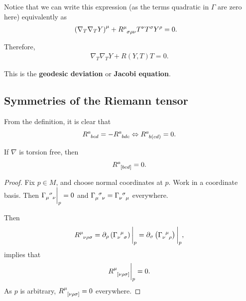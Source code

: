 
Notice that we can write this expression (as the terms quadratic in $\Gamma$ are zero here) equivalently as 
\begin{align}
    \left( \nabla_T \nabla_T Y \right)^{\mu} + \tensor{R}{^{\mu}_{\sigma \rho \nu}} T^{\nu} T^{\sigma} Y^{\rho} &= 0 
.\end{align}

Therefore,
\begin{align}
    \nabla_T \nabla_T Y + R \left( Y,T \right) T = 0
.\end{align}

This is the \textbf{geodesic deviation} or \textbf{Jacobi equation}.

\subsection{Symmetries of the Riemann tensor}

From the definition, it is clear that
\begin{align}
    \tensor{R}{^{a}_{bcd}} = -\tensor{R}{^{a}_{bdc}} \iff \tensor{R}{^{a}_{b ( cd )}} = 0 
.\end{align}

\begin{proposition}
    If $\nabla$ is torsion free, then
    \begin{align}
        \tensor{R}{^{a}_{[bcd]}} = 0
    .\end{align}
\end{proposition}

\begin{proof}
    Fix $p \in M$, and choose normal coordinates at $p$. Work in a coordinate basis. Then $\tensor{\Gamma}{_{\mu}^{\sigma}_\nu} \bigg|_{p} = 0$ and $\tensor{\Gamma}{_{\mu}^{\sigma}_\nu} = \tensor{\Gamma}{_{\nu}^{\sigma}_{\mu}}$ everywhere.

    Then
    \begin{align}
        \tensor{R}{^{\mu}_{\nu \rho \sigma}} = \partial_\rho \left( \tensor{\Gamma}{_{\nu}^{\mu}_\sigma} \right) \bigg|_p = \partial_\sigma \left( \tensor{\Gamma}{_{\nu}^{\mu}_{\rho}} \right) \bigg|_{p}
    ,\end{align}
    implies that
    \begin{align}
        \tensor{R}{^{\mu}_{\left[ \nu \rho \sigma \right] }} \bigg|_{p} = 0
    .\end{align}
    As $p$ is arbitrary, $\tensor{R}{^{\mu}_{\left[ \nu \rho \sigma \right] }} = 0$ everywhere.
\end{proof}

